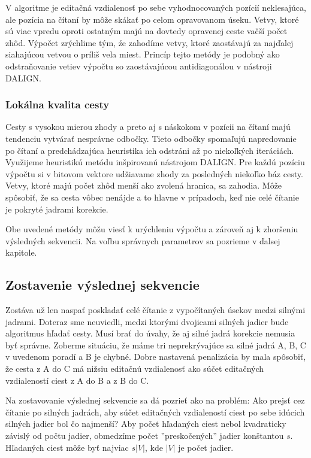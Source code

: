 V algoritme je editačná vzdialenosť po sebe vyhodnocovaných pozícií neklesajúca, ale pozícia na čítaní by môže skákať po celom opravovanom úseku. Vetvy, ktoré sú viac vpredu oproti ostatným majú na dovtedy opravenej ceste vačší počet zhôd. Výpočet zrýchlime tým, źe zahodíme vetvy, ktoré zaostávajú za najďalej siahajúcou vetvou o príliš vela miest. Princíp tejto metódy je podobný ako odstraňovanie vetiev výpočtu so zaostávajúcou antidiagonálou v nástroji DALIGN. 

\subsubsection{Lokálna kvalita cesty}

Cesty s vysokou mierou zhody a preto aj s náskokom v pozícii na čítaní majú tendenciu vytvárať nesprávne odbočky. Tieto odbočky spomaľujú napredovanie po čítaní a predchádzajúca heuristika ich odstráni až po niekoľkých iteráciách. Využijeme heuristikú metódu inšpirovanú nástrojom DALIGN. Pre každú pozíciu výpočtu si v bitovom vektore udžiavame zhody za posledných niekoľko báz cesty. Vetvy, ktoré majú počet zhôd menší ako zvolená hranica, sa zahodia. Môže spôsobiť, že sa cesta vôbec nenájde a to hlavne v prípadoch, keď nie celé čítanie je pokryté jadrami korekcie. 


Obe uvedené metódy môžu viesť k urýchleniu výpočtu a zároveň aj k zhoršeniu výsledných sekvencii. Na voľbu správnych parametrov sa pozrieme v ďalsej kapitole.

\subsection{Zostavenie výslednej sekvencie}

Zostáva už len naspať poskladať celé čítanie z vypočítaných úsekov medzi silnými jadrami. Doteraz sme neuviedli, medzi ktorými dvojicami silných jadier bude algoritmus hľadať cesty. Musí brať do úvahy, že aj silné jadrá korekcie nemusia byť správne. Zoberme situáciu, že máme tri neprekrývajúce sa silné jadrá A, B, C v uvedenom poradí a B je chybné. Dobre nastavená penalizácia by mala spôsobiť, že cesta z A do C má nižsiu editačnú vzdialenosť ako súčet editačných vzdialeností ciest z A do B a z B do C. 

Na zostavovanie výslednej sekvencie sa dá pozrieť ako na problém: Ako prejsť cez čítanie po silných jadrách, aby súčet editačných vzdialeností ciest po sebe idúcich silných jadier bol čo najmenší? Aby počet hľadaných ciest nebol kvadraticky závislý od počtu jadier, obmedzíme počet ''preskočených'' jadier konštantou $s$. Hľadaných ciest môže byť najviac $s|V|$, kde $|V|$ je počet jadier.

